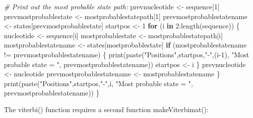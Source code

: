 \documentclass[
]{book}
\newenvironment{Shaded}{\begin{snugshade}}{\end{snugshade}}
\newcommand{\CommentTok}[1]{\textcolor[rgb]{0.56,0.35,0.01}{\textit{#1}}}
\newcommand{\ControlFlowTok}[1]{\textcolor[rgb]{0.13,0.29,0.53}{\textbf{#1}}}
\newcommand{\DecValTok}[1]{\textcolor[rgb]{0.00,0.00,0.81}{#1}}
\newcommand{\FunctionTok}[1]{\textcolor[rgb]{0.00,0.00,0.00}{#1}}
\newcommand{\NormalTok}[1]{#1}
\newcommand{\OtherTok}[1]{\textcolor[rgb]{0.56,0.35,0.01}{#1}}
\newcommand{\SpecialCharTok}[1]{\textcolor[rgb]{0.00,0.00,0.00}{#1}}
\newcommand{\StringTok}[1]{\textcolor[rgb]{0.31,0.60,0.02}{#1}}
\begin{document}
\begin{Shaded}
\begin{Highlighting}[]
     \CommentTok{\# Print out the most probable state path:}
\NormalTok{     prevnucleotide }\OtherTok{\textless{}{-}}\NormalTok{ sequence[}\DecValTok{1}\NormalTok{]}
\NormalTok{     prevmostprobablestate }\OtherTok{\textless{}{-}}\NormalTok{ mostprobablestatepath[}\DecValTok{1}\NormalTok{]}
\NormalTok{     prevmostprobablestatename }\OtherTok{\textless{}{-}}\NormalTok{ states[prevmostprobablestate]}
\NormalTok{     startpos }\OtherTok{\textless{}{-}} \DecValTok{1}
     \ControlFlowTok{for}\NormalTok{ (i }\ControlFlowTok{in} \DecValTok{2}\SpecialCharTok{:}\FunctionTok{length}\NormalTok{(sequence))}
\NormalTok{     \{}
\NormalTok{        nucleotide }\OtherTok{\textless{}{-}}\NormalTok{ sequence[i]}
\NormalTok{        mostprobablestate }\OtherTok{\textless{}{-}}\NormalTok{ mostprobablestatepath[i]}
\NormalTok{        mostprobablestatename }\OtherTok{\textless{}{-}}\NormalTok{ states[mostprobablestate]}
        \ControlFlowTok{if}\NormalTok{ (mostprobablestatename }\SpecialCharTok{!=}\NormalTok{ prevmostprobablestatename)}
\NormalTok{        \{}
           \FunctionTok{print}\NormalTok{(}\FunctionTok{paste}\NormalTok{(}\StringTok{"Positions"}\NormalTok{,startpos,}\StringTok{"{-}"}\NormalTok{,(i}\DecValTok{{-}1}\NormalTok{), }\StringTok{"Most probable state = "}\NormalTok{, prevmostprobablestatename))}
\NormalTok{           startpos }\OtherTok{\textless{}{-}}\NormalTok{ i}
\NormalTok{        \}}
\NormalTok{        prevnucleotide }\OtherTok{\textless{}{-}}\NormalTok{ nucleotide}
\NormalTok{        prevmostprobablestatename }\OtherTok{\textless{}{-}}\NormalTok{ mostprobablestatename}
\NormalTok{     \}}
     \FunctionTok{print}\NormalTok{(}\FunctionTok{paste}\NormalTok{(}\StringTok{"Positions"}\NormalTok{,startpos,}\StringTok{"{-}"}\NormalTok{,i, }\StringTok{"Most probable state = "}\NormalTok{, prevmostprobablestatename))}
\NormalTok{   \}}
\end{Highlighting}
\end{Shaded}

The viterbi() function requires a second function makeViterbimat():
\end{document}
